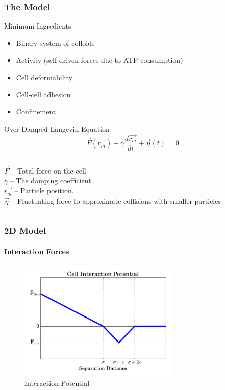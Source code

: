 \documentclass{beamer}
\begin{document}
  \begin{frame}
    \frametitle{The Model}
    Minimum Ingredients
    \begin{itemize}
    \item Binary system of colloids 
    \item Activity (self-driven forces due to ATP consumption)
    \item Cell deformability
    \item Cell-cell adhesion
    \item Confinement
    \end{itemize}
    
	\begin{exampleblock}{Over Damped Langevin Equation}
	$$\vec{F}(\vec{r _m}) - \gamma \frac{d\vec{r_m}}{dt} + \vec{\eta}(t) = 0$$
	\end{exampleblock}
	\begin{columns}[t]
     $\vec{F}$ -- Total force on the cell \\
     $\gamma$ -- The damping coefficient \\
      $\vec{r_m}$ -- Particle position. \\
    $\vec{\eta}$ -- Fluctuating force to approximate collisions with smaller particles \\
    \end{columns}
    
    \vfill
    
  \end{frame}

  \begin{frame}
    \frametitle{2D Model}
    \framesubtitle{Interaction Forces}
    \begin{figure}
      \includegraphics[width=3in]{interaction.png}
      \caption{Interaction Potential}
    \end{figure}

    \vfill
  \end{frame}
  
\end{document}

